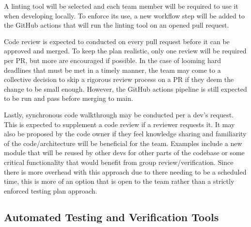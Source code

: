 \documentclass[12pt, titlepage]{article}
\begin{document}
A linting tool will be selected and each team member will be required to use it
when developing locally. To enforce its use, a new workflow step will be added
to the GitHub actions that will run the linting tool on an opened pull request.

Code review is expected to conducted on every pull request before it can be
approved and merged. To keep the plan realistic, only one review will be
required per PR, but more are encouraged if possible. In the case of looming
hard deadlines that must be met in a timely manner, the team may come to a
collective decision to skip a rigorous review process on a PR if they deem the
change to be small enough. However, the GitHub actions pipeline is still
expected to be run and pass before merging to main.

Lastly, synchronous code walkthrough may be conducted per a dev's request. This
is expected to supplement a code review if a reviewer requests it. It may also
be proposed by the code owner if they feel knowledge sharing and familiarity of
the code/architecture will be beneficial for the team. Examples include a new
module that will be reused by other devs for other parts of the codebase or
some critical functionality that would benefit from group review/verification.
Since there is more overhead with this approach due to there needing to be a
scheduled time, this is more of an option that is open to the team rather than
a strictly enforced testing plan approach.

\subsection{Automated Testing and Verification Tools}



\end{document}
